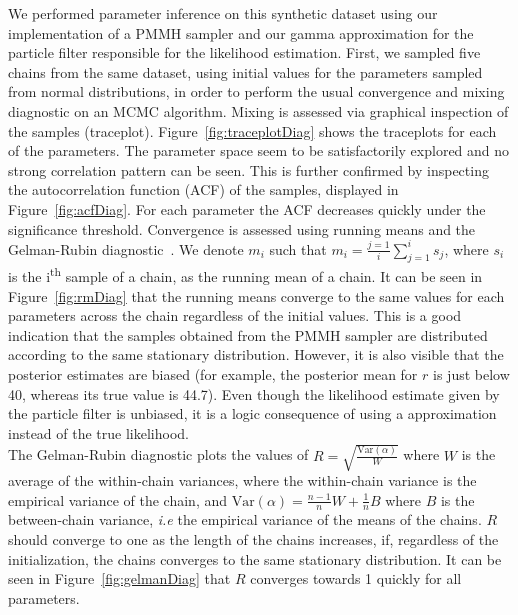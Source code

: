 \documentclass[12pt]{article}
\begin{document}
	We performed parameter inference on this synthetic dataset using our implementation of a PMMH sampler and our gamma approximation for the particle filter responsible for the likelihood estimation. First, we sampled five chains from the same dataset, using initial values for the parameters sampled from normal distributions,  in order to perform the usual convergence and mixing diagnostic on an MCMC algorithm. Mixing is assessed via graphical inspection of the samples (traceplot). Figure~\ref{fig:traceplotDiag} shows the traceplots for each of the parameters. The parameter space seem to be satisfactorily explored and no strong correlation pattern can be seen. This is further confirmed by inspecting the autocorrelation function (ACF) of the samples, displayed in Figure~\ref{fig:acfDiag}. For each parameter the ACF decreases quickly under the significance threshold. Convergence is assessed using running means and the Gelman-Rubin diagnostic~\cite{gelman1992inference}. We denote $m_i$ such that $m_i=\frac{j=1}{i}\sum_{j=1}^{i}s_j$, where $s_i$ is the i\textsuperscript{th} sample of a chain, as the running mean of a chain. It can be seen in Figure~\ref{fig:rmDiag} that the running means converge to the same values for each parameters across the chain regardless of the initial values. This is a good indication that the samples obtained from the PMMH sampler are distributed according to the same stationary distribution. However, it is also visible that the posterior estimates are biased (for example, the posterior mean for $r$ is just below 40, whereas its true value is 44.7). Even though the likelihood estimate given by the particle filter is unbiased, it is a logic consequence of using a approximation instead of the true likelihood. \\
	The Gelman-Rubin diagnostic plots the values of $R = \sqrt{\frac{\mathrm{Var}(\alpha)}{W}}$ where $W$ is the average of the within-chain variances, where the within-chain variance is the empirical variance of the chain, and $ \mathrm{Var}(\alpha) = \frac{n-1}{n}W + \frac{1}{n}B$ where $B$ is the between-chain variance, \emph{i.e} the empirical variance of the means of the chains. $R$ should converge to one as the length of the chains increases, if, regardless of the initialization, the chains converges to the same stationary distribution. It can be seen in Figure~\ref{fig:gelmanDiag} that $R$ converges towards 1 quickly for all parameters. \\
	
\end{document}
